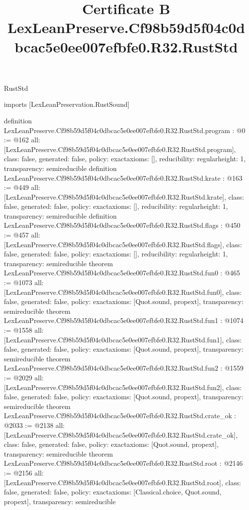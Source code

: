 \begin{lexlean}{RustStd}
\title{Certificate B LexLeanPreserve.Cf98b59d5f04c0dbcac5e0ee007efbfe0.R32.RustStd}
\begin{coremodule}
imports [LexLeanPreservation.RustSound]

definition LexLeanPreserve.Cf98b59d5f04c0dbcac5e0ee007efbfe0.R32.RustStd.program : @0 := @162 {
  all: [LexLeanPreserve.Cf98b59d5f04c0dbcac5e0ee007efbfe0.R32.RustStd.program],
  class: false,
  generated: false,
  policy: exact{axioms: []},
  reducibility: regular{height: 1},
  transparency: semireducible
}
definition LexLeanPreserve.Cf98b59d5f04c0dbcac5e0ee007efbfe0.R32.RustStd.krate : @163 := @449 {
  all: [LexLeanPreserve.Cf98b59d5f04c0dbcac5e0ee007efbfe0.R32.RustStd.krate],
  class: false,
  generated: false,
  policy: exact{axioms: []},
  reducibility: regular{height: 1},
  transparency: semireducible
}
definition LexLeanPreserve.Cf98b59d5f04c0dbcac5e0ee007efbfe0.R32.RustStd.flags : @450 := @457 {
  all: [LexLeanPreserve.Cf98b59d5f04c0dbcac5e0ee007efbfe0.R32.RustStd.flags],
  class: false,
  generated: false,
  policy: exact{axioms: []},
  reducibility: regular{height: 1},
  transparency: semireducible
}
theorem LexLeanPreserve.Cf98b59d5f04c0dbcac5e0ee007efbfe0.R32.RustStd.fun0 : @465 := @1073 {
  all: [LexLeanPreserve.Cf98b59d5f04c0dbcac5e0ee007efbfe0.R32.RustStd.fun0],
  class: false,
  generated: false,
  policy: exact{axioms: [Quot.sound, propext]},
  transparency: semireducible
}
theorem LexLeanPreserve.Cf98b59d5f04c0dbcac5e0ee007efbfe0.R32.RustStd.fun1 : @1074 := @1558 {
  all: [LexLeanPreserve.Cf98b59d5f04c0dbcac5e0ee007efbfe0.R32.RustStd.fun1],
  class: false,
  generated: false,
  policy: exact{axioms: [Quot.sound, propext]},
  transparency: semireducible
}
theorem LexLeanPreserve.Cf98b59d5f04c0dbcac5e0ee007efbfe0.R32.RustStd.fun2 : @1559 := @2029 {
  all: [LexLeanPreserve.Cf98b59d5f04c0dbcac5e0ee007efbfe0.R32.RustStd.fun2],
  class: false,
  generated: false,
  policy: exact{axioms: [Quot.sound, propext]},
  transparency: semireducible
}
theorem LexLeanPreserve.Cf98b59d5f04c0dbcac5e0ee007efbfe0.R32.RustStd.crate_ok : @2033 := @2138 {
  all: [LexLeanPreserve.Cf98b59d5f04c0dbcac5e0ee007efbfe0.R32.RustStd.crate_ok],
  class: false,
  generated: false,
  policy: exact{axioms: [Quot.sound, propext]},
  transparency: semireducible
}
theorem LexLeanPreserve.Cf98b59d5f04c0dbcac5e0ee007efbfe0.R32.RustStd.root : @2146 := @2156 {
  all: [LexLeanPreserve.Cf98b59d5f04c0dbcac5e0ee007efbfe0.R32.RustStd.root],
  class: false,
  generated: false,
  policy: exact{axioms: [Classical.choice, Quot.sound, propext]},
  transparency: semireducible
}


\end{coremodule}
\end{lexlean}
